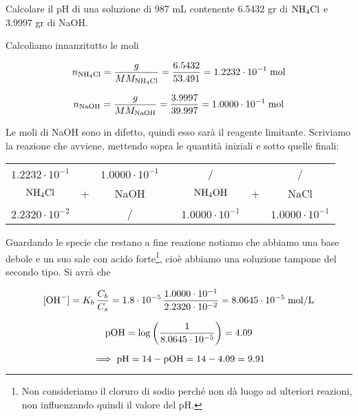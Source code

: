 \newpage

\begin{esercizio}
    Calcolare il pH di una soluzione di 987 mL contenente 6.5432 gr di $\rm NH_4Cl$ e 3.9997 gr di NaOH.
\end{esercizio}
\begin{soluzione}
    Calcoliamo innanzitutto le moli

$$n_{\text{NH}_4\text{Cl}}=\frac{g}{MM_{\text{NH}_4\text{Cl}}}=\frac{6.5432}{53.491}=1.2232 \cdot 10^{-1} \; \rm mol$$

$$n_{\text{NaOH}}=\frac{g}{MM_{\text{NaOH}}}=\frac{3.9997}{39.997}=1.0000 \cdot 10^{-1} \; \rm mol$$

Le moli di NaOH sono in difetto, quindi esso sarà il reagente limitante. Scriviamo la reazione che avviene, mettendo sopra le quantità iniziali e sotto quelle finali:

\begin{center}
    \begin{tabular}{ccccccc}
        $1.2232 \cdot 10^{-1}$ &  & $1.0000 \cdot 10^{-1}$ & & / & & /\\
        $\rm NH_4Cl$ & + & NaOH & \ce{->} & $\rm NH_4OH$ & + & NaCl\\
        $2.2320 \cdot 10^{-2}$ &  & / & & $1.0000 \cdot 10^{-1}$ & &$1.0000 \cdot 10^{-1}$\\
    \end{tabular}
\end{center}

Guardando le specie che restano a fine reazione notiamo che abbiamo una base debole e un suo sale con acido forte\footnote{Non consideriamo il cloruro di sodio perché non dà luogo ad ulteriori reazioni, non influenzando quindi il valore del pH.}, cioè abbiamo una soluzione tampone del secondo tipo. Si avrà che

$$[\text{OH}^-]=K_b\,\frac{C_b}{C_s}
=1.8 \cdot 10^{-5}\,\frac{1.0000 \cdot 10^{-1}}{2.2320 \cdot 10^{-2}}
=8.0645 \cdot 10^{-5} \; \rm mol/L$$

$$\rm pOH=\log \left( \frac{1}{8.0645 \cdot 10^{-5}} \right)=4.09$$

$$\implies \rm pH=14-pOH=14-4.09=9.91$$

\end{soluzione}

\newpage

